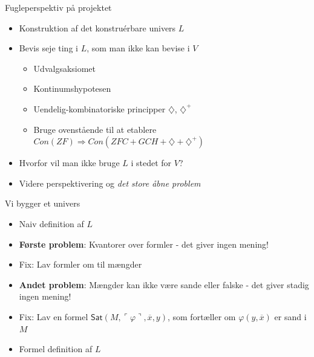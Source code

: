 \documentclass{beamer}
\begin{document}
\begin{frame}{Fugleperspektiv på projektet}
	\begin{itemize}
		\pause\item Konstruktion af det konstruérbare univers $L$
		\pause\item Bevis seje ting i $L$, som man ikke kan bevise i $V$
		\begin{itemize}
			\pause\item Udvalgsaksiomet
			\pause\item Kontinumshypotesen
			\pause\item Uendelig-kombinatoriske principper $\diamondsuit$, $\diamondsuit^+$
			\pause\item Bruge ovenstående til at etablere $Con(ZF)\Rightarrow Con(ZFC+GCH+\diamondsuit+\diamondsuit^+)$
		\end{itemize}
		\pause\item Hvorfor vil man ikke bruge $L$ i stedet for $V$?
		\pause\item Videre perspektivering og \textit{det store åbne problem}
	\end{itemize}
\end{frame}

\begin{frame}{Vi bygger et univers}
\begin{itemize}
\pause\item Naiv definition af $L$
\pause\item \textbf{Første problem}: Kvantorer over formler - det giver ingen mening!
\pause\item Fix: Lav formler om til mængder
\pause\item \textbf{Andet problem}: Mængder kan ikke være sande eller falske - det giver stadig ingen mening!
\pause\item Fix: Lav en formel $\mathsf{Sat}(M,\ulcorner\varphi\urcorner,\overline{x},y)$, som fortæller om $\varphi(y,\overline{x})$ er sand i $M$
\pause\item Formel definition af $L$
\end{itemize}
\end{frame}
\end{document}

